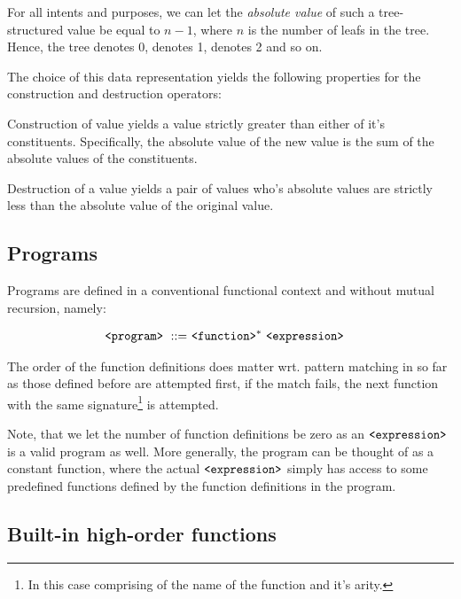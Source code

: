 For all intents and purposes, we can let the \emph{absolute value} of such a
tree-structured value be equal to $n-1$, where $n$ is the number of leafs in
the tree. Hence, the tree  denotes $0$,  denotes 1,
 denotes 2 and so on.

The choice of this data representation yields the following properties for the
construction and destruction operators:

\begin{lemma} Construction of value yields a value strictly greater than either
of it's constituents. Specifically, the absolute value of the new value is the
sum of the absolute values of the constituents.\end{lemma}

\begin{lemma} Destruction of a value yields a pair of values who's absolute
values are strictly less than the absolute value of the original
value.\end{lemma}

\subsection{Programs}

Programs are defined in a conventional functional context and without mutual
recursion, namely:

\begin{align}
\text{{\ttfamily<program>}}\ ::=&\ \text{{\ttfamily<function>}}^*\ \text{{\ttfamily<expression>}}
\end{align}

The order of the function definitions does matter wrt. pattern matching in so
far as those defined before are attempted first, if the match fails, the next
function with the same signature\footnote{In this case comprising of the name
of the function and it's arity.} is attempted.

Note, that we let the number of function definitions be zero as an
$\text{{\ttfamily<expression>}}$ is a valid program as well. More generally, the program
can be thought of as a constant function, where the actual
$\text{{\ttfamily<expression>}}$ simply has access to some predefined functions defined
by the function definitions in the program.

\subsection{Built-in high-order
functions}\label{section:language-higher-order-built-ins}

